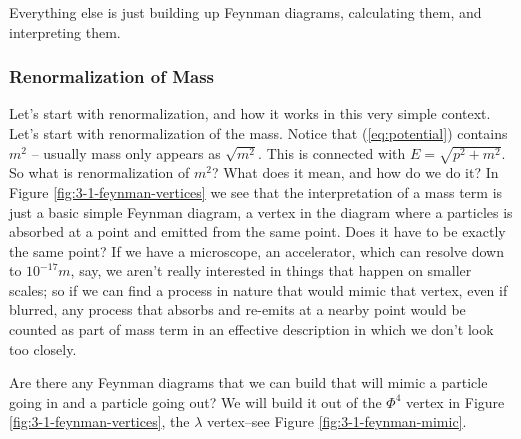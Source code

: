 \documentclass[]{article}
\begin{document}
Everything else is just building up Feynman diagrams, calculating them, and interpreting them.

\subsubsection{Renormalization of Mass}

Let's start with renormalization, and how it works in this very simple context.
Let's start with renormalization of the mass. Notice that (\ref{eq:potential}) contains $m^2$ -- usually mass only appears as $\sqrt{m^2}$. This is connected with $E=\sqrt{p^2 + m^2}$. So what is renormalization of $m^2$? What does it mean, and how do we do it? In Figure \ref{fig:3-1-feynman-vertices} we see that the interpretation of a mass term is just a basic simple Feynman diagram, a vertex in the diagram where a particles is absorbed at a point and emitted from the same point. Does it have to be exactly the same point? If we have a microscope, an accelerator, which can resolve down to $10^{-17}m$, say, we aren't really interested in things that happen on smaller scales; so if we can find a process in nature that would mimic that vertex,  even if blurred, any process that absorbs and re-emits at a nearby point would be counted as part of mass term in an effective description in which we don't look too closely.

Are there any Feynman diagrams that we can build that will mimic a particle going in and a particle going out? We will build it out of the $\Phi^4$ vertex in Figure \ref{fig:3-1-feynman-vertices}, the $\lambda$ vertex--see Figure \ref{fig:3-1-feynman-mimic}.
\end{document}

